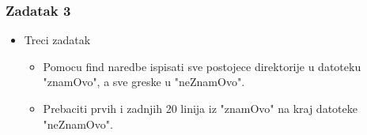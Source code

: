 \documentclass{beamer}
\begin{document}
\begin{frame}[t]
\frametitle{Zadatak 3}
\begin{itemize}
\item Treci zadatak
\begin{itemize}
	\item Pomocu find naredbe ispisati sve postojece direktorije u datoteku "znamOvo", a sve greske u "neZnamOvo".
	\item Prebaciti prvih i zadnjih 20 linija iz "znamOvo" na kraj datoteke "neZnamOvo".


\end{itemize}
\end{itemize}

\end{frame}
\end{document}
